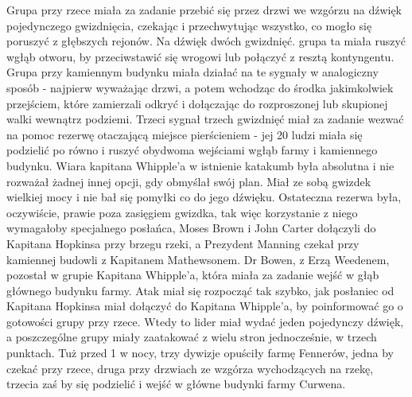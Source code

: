 Grupa przy rzece miała za zadanie przebić się przez drzwi we wzgórzu na dźwięk pojedynczego gwizdnięcia, czekając i przechwytując wszystko, co mogło się poruszyć z głębszych rejonów. Na dźwięk dwóch gwizdnięć. grupa ta miała ruszyć wgłąb otworu, by przeciwstawić się wrogowi lub połączyć z resztą kontyngentu. Grupa przy kamiennym budynku miała działać na te sygnały w analogiczny sposób - najpierw wyważając drzwi, a potem wchodząc do środka jakimkolwiek przejściem, które zamierzali odkryć i dołączając do rozproszonej lub skupionej walki wewnątrz podziemi. Trzeci sygnał trzech gwizdnięć miał za zadanie wezwać na pomoc rezerwę otaczającą miejsce pierścieniem - jej 20 ludzi miała się podzielić po równo i ruszyć obydwoma wejściami wgłąb farmy i kamiennego budynku. Wiara kapitana Whipple'a w istnienie katakumb była absolutna i nie rozważał żadnej innej opcji, gdy obmyślał swój plan. Miał ze sobą gwizdek wielkiej mocy i nie bał się pomyłki co do jego dźwięku. Ostateczna rezerwa była, oczywiście, prawie poza zasięgiem gwizdka, tak więc korzystanie z niego wymagałoby specjalnego posłańca, Moses Brown i John Carter dołączyli do Kapitana Hopkinsa przy brzegu rzeki, a Prezydent Manning czekał przy kamiennej budowli z Kapitanem Mathewsonem. Dr Bowen, z Erzą Weedenem, pozostał w grupie Kapitana Whipple'a, która miała za zadanie wejść w głąb głównego budynku farmy. Atak miał się rozpocząć tak szybko, jak posłaniec od Kapitana Hopkinsa miał dołączyć do Kapitana Whipple'a, by poinformować go o gotowości grupy przy rzece. Wtedy to lider miał wydać jeden pojedynczy dźwięk, a poszczególne grupy miały zaatakować z wielu stron jednocześnie, w trzech punktach. Tuż przed 1 w nocy, trzy dywizje opuściły farmę Fennerów, jedna by czekać przy rzece, druga przy drzwiach ze wzgórza wychodzących na rzekę, trzecia zaś by się podzielić i wejść w główne budynki farmy Curwena. 

